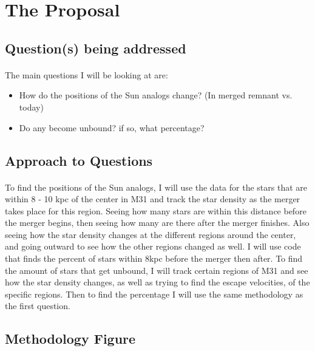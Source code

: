 \documentclass{report}
\begin{document}
\section*{The Proposal}
\subsection*{Question(s) being addressed}
\paragraph{}

The main questions I will be looking at are:
\begin{itemize}
  \item How do the positions of the Sun analogs change? (In merged remnant vs. today)
  \item Do any become unbound? if so, what percentage?
\end{itemize}

\subsection*{Approach to Questions}
\paragraph{}

To find the positions of the Sun analogs, I will use the data for the stars that are within 8 - 10 kpc of the center in M31 and track the star density as the merger takes place for this region. Seeing how many stars are within this distance before the merger begins, then seeing how many are there after the merger finishes. Also seeing how the star density changes at the different regions around the center, and going outward to see how the other regions changed as well. 
I will use code that finds the percent of stars within 8kpc before the merger then after. 
To find the amount of stars that get unbound, I will track certain regions of M31 and see how the star density changes, as well as trying to find the escape velocities, of the specific regions. Then to find the percentage I will use the same methodology as the first question. 

\subsection*{Methodology Figure}
\paragraph{}
\end{document}
